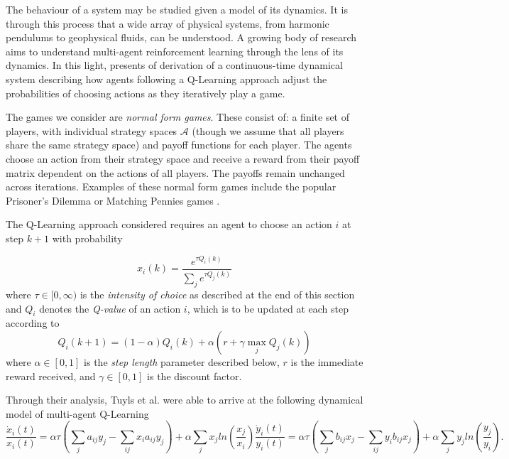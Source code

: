 \documentclass[sigconf,anonymous]{aamas}
\begin{document}
The behaviour of a system may be studied given a model of its
dynamics. It is through this process that a wide array of physical
systems, from harmonic pendulums to geophysical fluids, can be
understood. A growing body of research aims to understand multi-agent
reinforcement learning through the lens of its dynamics. In this
light, \cite{Tuyls2006AnGames} presents of derivation of a continuous-time dynamical system describing how agents following a Q-Learning
approach adjust the probabilities of choosing actions as they
iteratively play a game. 

The games we consider are \textit{normal form games}. These consist of: a finite set of players, with individual strategy spaces $\mathcal{A}$ (though we assume that all players share the same strategy space) and payoff functions for each player. The agents choose an action from their strategy space and receive a reward from their payoff matrix dependent on the actions of all players. The payoffs remain unchanged across iterations. Examples of these normal form games include the popular Prisoner's Dilemma or Matching Pennies games \cite{Tuyls2006AnGames}.

The Q-Learning approach considered requires
an agent to choose an action $i$ at step $k+1$ with probability

\begin{equation}
    x_i(k) = \frac{e^{\tau Q_i(k)}}{\sum_j e^{\tau Q_j(k)}}
\end{equation}
%
where $\tau \in [0, \infty)$ is the \textit{intensity of choice} as described at the end of this section and $Q_i$ denotes the \textit{Q-value} of an action $i$, which is to be updated at each step according to
%
\begin{equation}
\label{eqn::Qupdate}
    Q_i(k+1) = (1 - \alpha) Q_i(k) + \alpha (r + \gamma \max_j Q_j(k))
\end{equation}
%
where $\alpha \in [0, 1]$ is the \textit{step length} parameter described below, $r$ is the immediate reward received, and $\gamma \in [0, 1]$ is the discount factor.

Through their analysis, Tuyls et al. were able to
arrive at the following dynamical model of multi-agent Q-Learning
%
\begin{subequations}
\label{eqn::EOM}
    \begin{equation}
        \frac{\dot{x}_i(t)}{x_i(t)} = \alpha \tau (\sum_{j} a_{ij} y_j - \sum_{i j} x_i a_{ij} y_j)
        + \alpha \sum_j x_j ln(\frac{x_j}{x_i}) 
    \end{equation}
    \begin{equation}
        \frac{\dot{y}_i(t)}{y_i(t)} = \alpha \tau (\sum_{j} b_{ij} x_j - \sum_{i j} y_i b_{ij} x_j)
        + \alpha \sum_j y_j ln(\frac{y_j}{y_i}).
    \end{equation}
\end{subequations}
\end{document}
